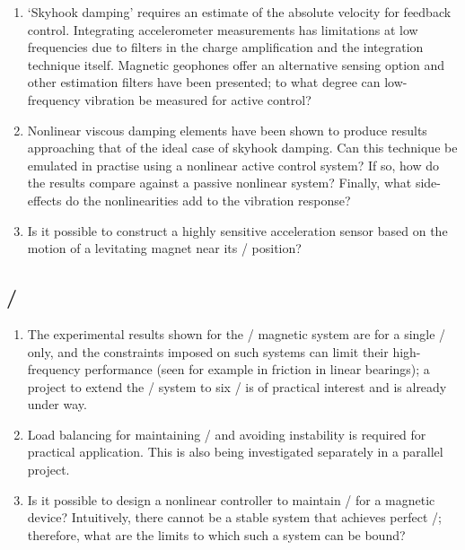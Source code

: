 \documentclass[10pt,a4paper]{memoir}
\begin{document}
\begin{enumerate}
\item
`Skyhook damping' requires an estimate of the absolute velocity for feedback control.
Integrating accelerometer measurements has limitations at low frequencies due to filters in the charge amplification and the integration technique itself.
Magnetic geophones offer an alternative sensing option and other estimation filters have been presented; to what degree can low-frequency vibration be measured for active control?

\item
Nonlinear viscous damping elements have been shown to produce results approaching that of the ideal case of skyhook damping.
Can this technique be emulated in practise using a nonlinear active control system?
If so, how do the results compare against a passive nonlinear system?
Finally, what side-effects do the nonlinearities add to the vibration response?

\item
Is it possible to construct a highly sensitive acceleration sensor based on the motion of a levitating magnet near its \qzs/ position?
\end{enumerate}

\subsection{\QZS/}

\begin{enumerate}
\item
The experimental results shown for the \qzs/ magnetic system are for a single \dof/ only, and the constraints imposed on such systems can limit their high-frequency performance (seen for example in friction in linear bearings); a project to extend the \qzs/ system to six \dofs/ is of practical interest and is already under way.

\item
Load balancing for maintaining \qzs/ and avoiding instability is required for practical application.
This is also being investigated separately in a parallel project.

\item
Is it possible to design a nonlinear controller to maintain \qzs/ for a magnetic device?
Intuitively, there cannot be a stable system that achieves perfect \qzs/; therefore, what are the limits to which such a system can be bound?
\end{enumerate}
\end{document}
